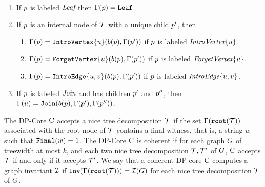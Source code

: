 \begin{definition}[Dynamization]\label{Dynamization}
$ $
\begin{enumerate}
\item If $p$ is labeled $\texttt{\it{Leaf}}$ then $\Gamma(p) = \texttt{Leaf}$%
\item If $p$ is an internal node of $\mathcal{T}$ with a unique child $p'$, then 
\begin{enumerate}
    \item $\Gamma(p) = \texttt{IntroVertex}\{u\}(b(p),\Gamma(p'))$ if $p$ is labeled $\texttt{\it{IntroVertex}}\{u\}$. 
    \item $\Gamma(p) = \texttt{ForgetVertex}\{u\}(b(p),\Gamma(p'))$ if $p$ is labeled $\texttt{\it{ForgetVertex}}\{u\}$.
    \item $\Gamma(p) = \texttt{IntroEdge}\{u,v\}(b(p),\Gamma(p'))$ if $p$ is labeled $\texttt{\it{IntroEdge}}\{u,v\}$. 
\end{enumerate}
\item If $p$ is labeled $\texttt{\it{Join}}$ and has children $p'$ and $p''$, then $\Gamma(u) = \texttt{Join}(b(p),\Gamma(p'),\Gamma(p''))$. 
\end{enumerate}
\end{definition}

The DP-Core $\mathrm{C}$ accepts a nice tree decomposition  $\mathcal{T}$ if the set 
$\Gamma(\texttt{root}(\mathcal{T}))$ associated with the root node of $\mathcal{T}$ contains a final witness, 
that is, a string $w$ such that $\texttt{Final}(w)=1$. The DP-Core $\mathrm{C}$ is coherent if for 
each graph $G$ of treewidth at most $k$, and each two nice tree 
decomposition $\mathcal{T},\mathcal{T}'$ of $G$, $\mathrm{C}$ accepts $\mathcal{T}$ if and only if 
it accepts $\mathcal{T}'$. We say that a coherent DP-core $\mathrm{C}$ computes a graph invariant 
$\mathcal{I}$ if $\texttt{Inv}(\Gamma(\texttt{root}(\mathcal{T}))) = \mathcal{I}(G)$ for each nice tree decomposition $\mathcal{T}$ of $G$. 



